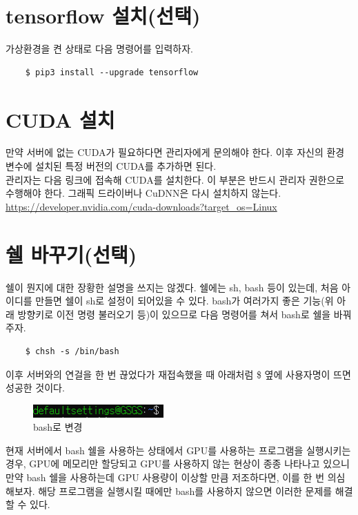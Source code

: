 \section{tensorflow 설치(선택)}
가상환경을 켠 상태로 다음 명령어를 입력하자.
\begin{lstlisting}
    $ pip3 install --upgrade tensorflow
\end{lstlisting}
\section{CUDA 설치}
만약 서버에 없는 \acs{CUDA}가 필요하다면 관리자에게 문의해야 한다. 이후 자신의 환경변수에 설치된 특정 버전의 \acs{CUDA}를 추가하면 된다.~\\


관리자는 다음 링크에 접속해 \acs{CUDA}를 설치한다. 이 부분은 반드시 관리자 권한으로 수행해야 한다. 그래픽 드라이버나 CuDNN은 다시 설치하지 않는다.\\
    \url{https://developer.nvidia.com/cuda-downloads?target_os=Linux}
    
\section{쉘 바꾸기(선택)}
쉘이 뭔지에 대한 장황한 설명을 쓰지는 않겠다. 쉘에는 sh, bash 등이 있는데, 처음 아이디를 만들면 쉘이 sh로 설정이 되어있을 수 있다. bash가 여러가지 좋은 기능(위 아래 방향키로 이전 명령 불러오기 등)이 있으므로 다음 명령어를 쳐서 bash로 쉘을 바꿔주자.
\begin{lstlisting}
    $ chsh -s /bin/bash
\end{lstlisting}
이후 서버와의 연걸을 한 번 끊었다가 재접속했을 때 아래처럼 \$ 옆에 사용자명이 뜨면 성공한 것이다.
\begin{figure}[H]
	\begin{center}
        \includegraphics[width=5cm]{bash}
        \caption{bash로 변경}
    \end{center}
\end{figure}
현재 서버에서 bash 쉘을 사용하는 상태에서 GPU를 사용하는 프로그램을 실행시키는 경우, GPU에 메모리만 할당되고 GPU를 사용하지 않는 현상이 종종 나타나고 있으니 만약 bash 쉘을 사용하는데 GPU 사용량이 이상할 만큼 저조하다면, 이를 한 번 의심해보자. 해당 프로그램을 실행시킬 때에만 bash를 사용하지 않으면 이러한 문제를 해결할 수 있다.